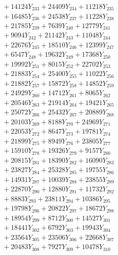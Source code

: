 \documentclass[a4paper,10pt]{article}
\begin{document}
{\begin{align}
&\;  + 14124 Y_{233} + 24409 Y_{234} + 11218 Y_{235} \\[0.3ex]
&\;  + 16485 Y_{236} + 24538 Y_{237} + 11228 Y_{238} \\[0.5ex]\allowbreak
&\;  + 21785 Y_{239} + 7639 Y_{240} + 12779 Y_{241} \\[0.3ex]
&\;  + 9094 Y_{242} + 21142 Y_{243} + 11048 Y_{244} \\[0.3ex]
&\;  + 22676 Y_{245} + 18510 Y_{246} + 12399 Y_{247} \\[0.3ex]
&\;  + 6547 Y_{248} + 19632 Y_{249} + 17368 Y_{250} \\[0.3ex]
&\;  + 19992 Y_{251} + 8015 Y_{252} + 22702 Y_{253} \\[0.3ex]
&\;  + 21883 Y_{254} + 25400 Y_{255} + 11022 Y_{256} \\[0.3ex]
&\;  + 21882 Y_{257} + 15872 Y_{258} + 14852 Y_{259} \\[0.3ex]
&\;  + 24929 Y_{260} + 14712 Y_{261} + 8065 Y_{262} \\[0.3ex]
&\;  + 20546 Y_{263} + 21914 Y_{264} + 19421 Y_{265} \\[0.3ex]
&\;  + 25072 Y_{266} + 25432 Y_{267} + 20889 Y_{268} \\[0.5ex]\allowbreak
&\;  + 20103 Y_{269} + 8188 Y_{270} + 24969 Y_{271} \\[0.3ex]
&\;  + 22053 Y_{272} + 8647 Y_{273} + 19781 Y_{274} \\[0.3ex]
&\;  + 21899 Y_{275} + 8949 Y_{276} + 23805 Y_{277} \\[0.3ex]
&\;  + 15910 Y_{278} + 19326 Y_{279} + 9157 Y_{280} \\[0.3ex]
&\;  + 20815 Y_{281} + 18390 Y_{282} + 16090 Y_{283} \\[0.3ex]
&\;  + 23827 Y_{284} + 25328 Y_{285} + 19755 Y_{286} \\[0.3ex]
&\;  + 14931 Y_{287} + 10039 Y_{288} + 23855 Y_{289} \\[0.3ex]
&\;  + 22870 Y_{290} + 12880 Y_{291} + 11732 Y_{292} \\[0.3ex]
&\;  + 8883 Y_{293} + 23811 Y_{294} + 10386 Y_{295} \\[0.3ex]
&\;  + 19798 Y_{296} + 20822 Y_{297} + 18672 Y_{298} \\[0.5ex]\allowbreak
&\;  + 18954 Y_{299} + 8712 Y_{300} + 14527 Y_{301} \\[0.3ex]
&\;  + 18441 Y_{302} + 6792 Y_{303} + 19943 Y_{304} \\[0.3ex]
&\;  + 23564 Y_{305} + 23506 Y_{306} + 22668 Y_{307} \\[0.3ex]
&\;  + 20483 Y_{308} + 7927 Y_{309} + 10478 Y_{310} \\[0.3ex]

\end{align}}
\end{document}
